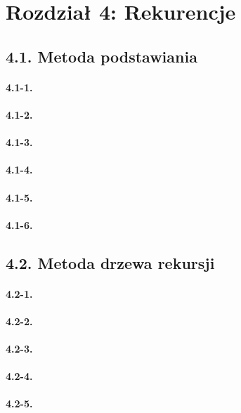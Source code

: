 \section*{Rozdział 4: Rekurencje}

\subsection*{4.1. Metoda podstawiania}

\paragraph{4.1-1.}
\paragraph{4.1-2.}
\paragraph{4.1-3.}
\paragraph{4.1-4.}
\paragraph{4.1-5.}
\paragraph{4.1-6.}

\subsection*{4.2. Metoda drzewa rekursji}

\paragraph{4.2-1.}
\paragraph{4.2-2.}
\paragraph{4.2-3.}
\paragraph{4.2-4.}
\paragraph{4.2-5.}

